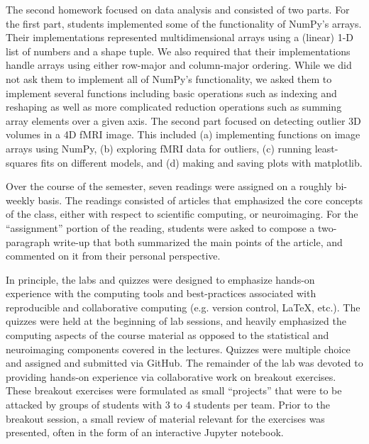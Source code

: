 The second homework focused on data analysis and consisted of two parts. 
For the first part, students implemented some of the functionality of NumPy's arrays.
Their implementations represented multidimensional arrays using a (linear) 1-D list
of numbers and a shape tuple.
We also required that their implementations handle arrays using either
row-major and column-major ordering.
While we did not ask them to implement all of NumPy's functionality,
we asked them to implement several functions including basic operations
such as indexing and reshaping as well as more complicated
reduction operations such as summing array elements over a given axis. 
The second part focused on detecting outlier 3D volumes in a 4D fMRI image.
This included
(a) implementing functions on image arrays using NumPy,
(b) exploring fMRI data for outliers,
(c) running least-squares fits on different models, and
(d) making and saving plots with matplotlib.

Over the course of the semester, seven readings were assigned on a roughly
bi-weekly basis.
The readings consisted of articles that emphasized the core concepts
of the class, either with respect to scientific computing, or neuroimaging.
For the ``assignment'' portion of the reading, students were asked to compose
a two-paragraph write-up that both summarized the main points of the article,
and commented on it from their personal perspective.

In principle, the labs and quizzes were designed to emphasize hands-on 
experience with the computing tools and best-practices associated with
reproducible and collaborative computing (e.g. version control, \LaTeX, etc.).
The quizzes were held at the beginning of lab sessions, and heavily emphasized
the computing aspects of the course material as opposed to the statistical and
neuroimaging components covered in the lectures.
Quizzes were multiple choice and assigned and submitted via GitHub.
The remainder of the lab was devoted to providing hands-on experience via
collaborative work on breakout exercises.
These breakout exercises were formulated as small ``projects'' that were to be
attacked by groups of students with 3 to 4 students per team.
Prior to the breakout session, a small review of material relevant for the 
exercises was presented, often in the form of an interactive Jupyter notebook.

